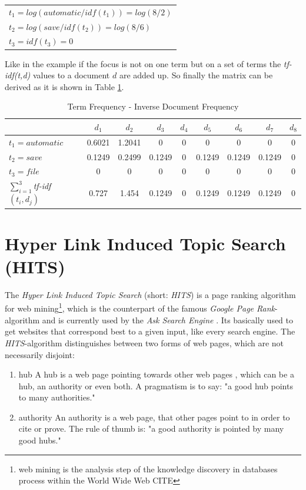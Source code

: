 \begin{table}[h]
  \centering
  \begin{tabular}{l}
    $t_1 = log(automatic / idf(t_1)) = log(8/2)$  \\
    $t_2 = log(save / idf(t_2))=log(8/6)$ \\
    $t_3 = idf(t_3)=0$ 
 \end{tabular}
\end{table}

Like in the example if the focus is not on one term but on a set of terms the \emph{tf-idf(t,d)} values to a document $d$ are added up. So finally the matrix can be derived as it is shown in Table \ref{table:tfidf_table}.

\begin{table}[h]
  \centering
  \begin{tabular}{| l | c | c | c | c | c | c | c | c |}
    \hline
    & $d_1$ & $d_2$ & $d_3$ & $d_4$ & $d_5$ & $d_6$ & $d_7$ & $d_8$ \\ \hline
    $t_1 = automatic$ & 0.6021 & 1.2041 & 0 & 0 & 0 & 0 & 0 & 0 \\ \hline
    $t_2 = save$ & 0.1249 & 0.2499 & 0.1249 &0 & 0.1249 & 0.1249 & 0.1249 & 0 \\ \hline
    $t_3 = file $ & 0 & 0 & 0 & 0 & 0 & 0 & 0 & 0 \\ \hline \hline
    $\sum\nolimits_{i=1}^3$\emph{tf-idf}$(t_i,d_j)$ & 0.727 & 1.454 & 0.1249 & 0 & 0.1249 & 0.1249 & 0.1249 & 0\\ \hline
  \end{tabular}
  \caption{Term Frequency - Inverse Document Frequency}
  \label{table:tfidf_table}
\end{table}

\section{Hyper Link Induced Topic Search (HITS)}
\label{sec:HITS}
The \emph{Hyper Link Induced Topic Search} (short: \emph{HITS}) is a page ranking algorithm for web mining\footnote{web mining is the analysis step of the knowledge discovery in databases process within the World Wide Web CITE}, which is the counterpart of the famous \emph{Google Page Rank}-algorithm and is currently used by the \emph{Ask Search Engine} \cite{wiki:HITS}. Its basically used to get websites that correspond best to a given input, like every search engine. 
The \emph{HITS}-algorithm distinguishes between two forms of web pages, which are not necessarily disjoint:
\begin{enumerate}
  \item hub \newline
  A hub is a web page pointing towards other web pages , which can be a hub, an authority or even both. A pragmatism is to say: "a good hub points to many authorities."
  \item authority \newline
  An authority is a web page, that other pages point to in order to cite or prove. The rule of thumb is: "a good authority is pointed by many good hubs."
\end{enumerate}

